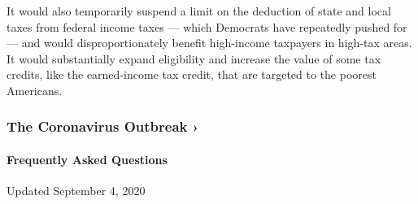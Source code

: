 It would also temporarily suspend a limit on the deduction of state and
local taxes from federal income taxes --- which Democrats have
repeatedly pushed for --- and would disproportionately benefit
high-income taxpayers in high-tax areas. It would substantially expand
eligibility and increase the value of some tax credits, like the
earned-income tax credit, that are targeted to the poorest Americans.

\href{https://www.nytimes3xbfgragh.onion/news-event/coronavirus?action=click\&pgtype=Article\&state=default\&region=MAIN_CONTENT_3\&context=storylines_faq}{}

\hypertarget{the-coronavirus-outbreak-}{%
\subsubsection{The Coronavirus Outbreak
›}\label{the-coronavirus-outbreak-}}

\hypertarget{frequently-asked-questions}{%
\paragraph{Frequently Asked
Questions}\label{frequently-asked-questions}}

Updated September 4, 2020

